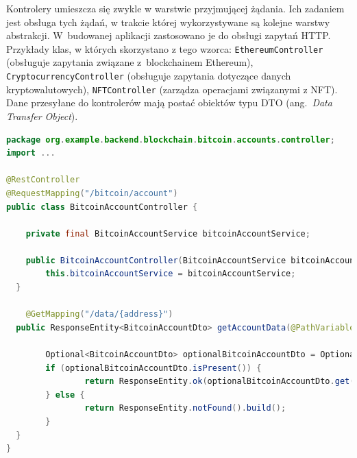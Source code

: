 Kontrolery umieszcza się zwykle w warstwie przyjmującej żądania. Ich zadaniem jest obsługa tych żądań, w trakcie której wykorzystywane są kolejne warstwy abstrakcji.
W~budowanej aplikacji zastosowano je do obsługi zapytań HTTP. Przykłady klas, w których skorzystano z tego wzorca: \texttt{EthereumController} (obsługuje zapytania związane z~blockchainem Ethereum), \texttt{CryptocurrencyController} (obsługuje zapytania dotyczące danych kryptowalutowych), \texttt{NFTController} (zarządza operacjami związanymi z NFT). Dane przesyłane do kontrolerów mają postać obiektów typu DTO (ang.~\emph{Data Transfer Object}).\\[-10pt]
\begin{lstlisting}[language=Java, style=JavaStyle]
package org.example.backend.blockchain.bitcoin.accounts.controller;
import ...

@RestController
@RequestMapping("/bitcoin/account")
public class BitcoinAccountController {

	private final BitcoinAccountService bitcoinAccountService;
	
	public BitcoinAccountController(BitcoinAccountService bitcoinAccountService) {
		this.bitcoinAccountService = bitcoinAccountService;
  }
  
	@GetMapping("/data/{address}")
  public ResponseEntity<BitcoinAccountDto> getAccountData(@PathVariable String address) {

		Optional<BitcoinAccountDto> optionalBitcoinAccountDto = Optional.ofNullable(bitcoinAccountService.getAllAccountData(address));
		if (optionalBitcoinAccountDto.isPresent()) {
				return ResponseEntity.ok(optionalBitcoinAccountDto.get());
		} else {
				return ResponseEntity.notFound().build();
		}
  }
}
\end{lstlisting}

